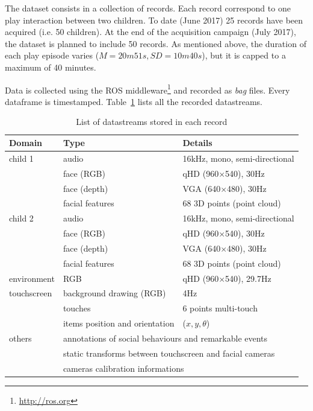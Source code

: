 \documentclass{article}
\newcommand{\ie}{i.e.\xspace}
\begin{document}
The dataset consists in a collection of records. Each record correspond to one
play interaction between two children. To date (June 2017) 25 records have been acquired (\ie 50 children). At the end of the acquisition campaign
(July 2017), the dataset is planned to include 50 records. As
mentioned above, the duration of each play episode varies ($M=20m51s,
SD=10m40s$), but it is capped to a maximum of 40 minutes.

Data is collected using the ROS middleware\footnote{\url{http://ros.org}} and
recorded as \emph{bag} files. Every dataframe is timestamped.
Table~\ref{table|datastreams} lists all the recorded datastreams.

\begin{table}[]
\centering
\caption{List of datastreams stored in each record}
\label{table|datastreams}
\begin{tabular}{@{}lll@{}}
\toprule
\bf Domain  & \bf Type                              & \bf Details                          \\ \midrule
child 1     & audio                                 & 16kHz, mono, semi-directional        \\
            & face (RGB)                            & qHD (960$\times$540), 30Hz           \\
            & face (depth)                          & VGA (640$\times$480), 30Hz           \\
            & facial features                       & 68 3D points (point cloud)           \\ \midrule
child 2     & audio                                 & 16kHz, mono, semi-directional        \\
            & face (RGB)                            & qHD (960$\times$540), 30Hz           \\
            & face (depth)                          & VGA (640$\times$480), 30Hz           \\
            & facial features                       & 68 3D points (point cloud)           \\ \midrule
environment & RGB                                   & qHD (960$\times$540), 29.7Hz         \\ \midrule
touchscreen & background drawing (RGB)              & 4Hz                                  \\
            & touches                               & 6 points multi-touch                 \\
            & items position and orientation        & ($x,y,\theta$)                       \\ \midrule
others      & \multicolumn{2}{l}{annotations of social behaviours and remarkable events}   \\
            & \multicolumn{2}{l}{static transforms between touchscreen and facial cameras} \\
            & \multicolumn{2}{l}{cameras calibration informations}                         \\ \bottomrule
\end{tabular}
\end{table}
\end{document}
